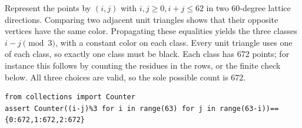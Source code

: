 Represent the points by $(i,j)$ with $i,j\ge0,i+j\le62$ in two 60-degree lattice directions. Comparing two adjacent unit triangles shows that their opposite vertices have the same color. Propagating these equalities yields the three classes $i-j\pmod3$, with a constant color on each class. Every unit triangle uses one of each class, so exactly one class must be black. Each class has 672 points; for instance this follows by counting the residues in the rows, or the finite check below. All three choices are valid, so the sole possible count is $\boxed{672}$.\begin{verbatim}
from collections import Counter
assert Counter((i-j)%3 for i in range(63) for j in range(63-i))=={0:672,1:672,2:672}
\end{verbatim}

